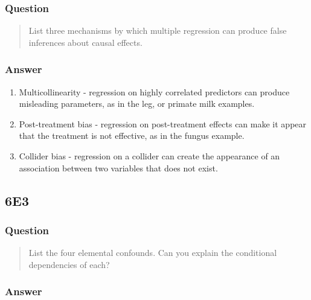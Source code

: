 \documentclass[
]{book}
\begin{document}
\hypertarget{question-49}{%
\subsubsection*{Question}\label{question-49}}

\begin{quote}
List three mechanisms by which multiple regression can produce false inferences about causal effects.
\end{quote}

\hypertarget{answer-49}{%
\subsubsection*{Answer}\label{answer-49}}

\begin{enumerate}
\def\labelenumi{\arabic{enumi}.}
\item
  Multicollinearity - regression on highly correlated predictors can produce misleading parameters, as in the leg, or primate milk examples.
\item
  Post-treatment bias - regression on post-treatment effects can make it appear that the treatment is not effective, as in the fungus example.
\item
  Collider bias - regression on a collider can create the appearance of an association between two variables that does not exist.
\end{enumerate}

\hypertarget{e3-4}{%
\subsection*{6E3}\label{e3-4}}

\hypertarget{question-50}{%
\subsubsection*{Question}\label{question-50}}

\begin{quote}
List the four elemental confounds. Can you explain the conditional dependencies of each?
\end{quote}

\hypertarget{answer-50}{%
\subsubsection*{Answer}\label{answer-50}}
\end{document}
